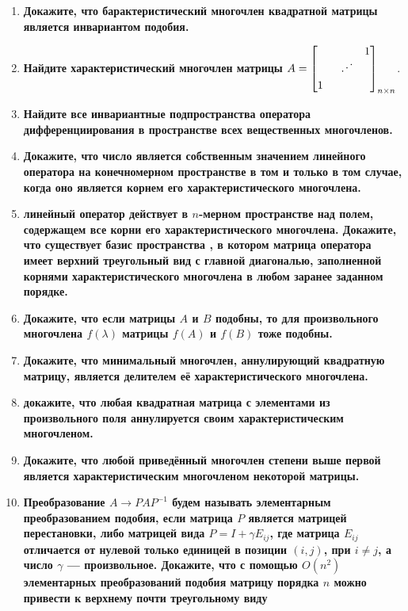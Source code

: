 \documentclass[12pt]{article} %
\begin{document}
\begin{enumerate}
    \item \textbf{Докажите, что барактеристический многочлен квадратной матрицы является инвариантом подобия.}
    \item \textbf{Найдите характеристический многочлен матрицы $A = 
    \begin{bmatrix}
         &&1\\
         &\rotatebox[origin=c]{75}{$\ddots$}&\\
         1&& \\
    \end{bmatrix}_{n \times n}
    $}.
    \item \textbf{Найдите все инвариантные подпространства оператора дифференциирования в пространстве всех вещественных многочленов.}
    \item \textbf{Докажите, что число является собственным значением линейного оператора на конечномерном пространстве в том и только в том случае, когда оно является корнем его характеристического многочлена.}
    \item \textbf{линейный оператор действует в $n$-мерном пространстве над полем, содержащем все корни его характеристического многочлена. Докажите, что существует базис пространства , в котором матрица оператора имеет верхний треугольный вид с главной диагональю, заполненной корнями характеристического многочлена в любом заранее заданном порядке.}
    \item \textbf{Докажите, что если матрицы $A$ и $B$ подобны, то для произвольного многочлена $f(\lambda)$ матрицы $f(A)$ и $f(B)$ тоже подобны.}
    \item \textbf{Докажите, что минимальный многочлен, аннулирующий квадратную матрицу, является делителем её характеристического многочлена.}
    \item \textbf{докажите, что любая квадратная матрица с элементами из произвольного поля аннулируется своим характеристическим многочленом.}
    \item \textbf{Докажите, что любой приведённый многочлен степени выше первой является характеристическим многочленом некоторой матрицы.}
    \item \textbf{Преобразование $A \rightarrow PAP^{-1}$ будем называть элементарным преобразованием подобия, если матрица $P$ является матрицей перестановки, либо матрицей вида $P = I + \gamma E_{ij}$, где матрица $E_{ij} $ отличается от нулевой только единицей в позиции $(i, j)$, при $i \neq j$, а число $\gamma$ --- произвольное. Докажите, что с помощью $O(n^2)$ элементарных преобразований подобия матрицу порядка $n$ можно привести к верхнему почти треугольному виду}%

\end{enumerate}
\end{document}

